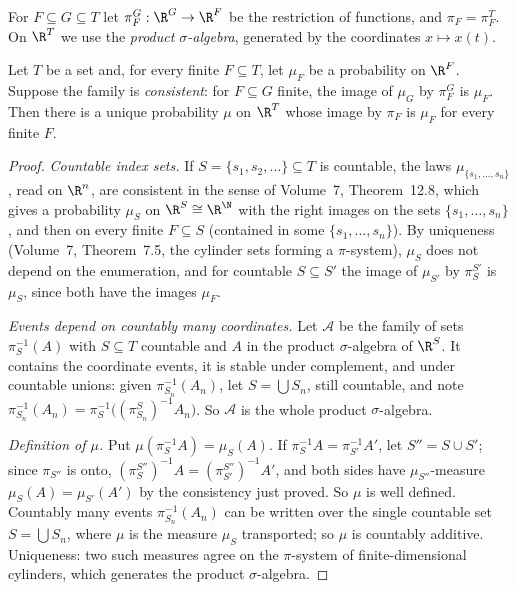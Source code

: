 For $F\subseteq G\subseteq T$ let $\pi^G_F:\R^G\to\R^F$ be the restriction of functions, and $\pi_F=\pi^T_F$. On $\R^T$ we use the \emph{product $\sigma$-algebra}, generated by the coordinates
$x\mapsto x(t)$.

\begin{theorem}\label{thm:kolmext}
Let $T$ be a set and, for every finite $F\subseteq T$, let $\mu_F$ be a probability on $\R^F$. Suppose the family is \emph{consistent}: for $F\subseteq G$ finite, the image of $\mu_G$ by $\pi^G_F$ is $\mu_F$.
Then there is a unique probability $\mu$ on $\R^T$ whose image by $\pi_F$ is $\mu_F$ for every finite $F$.
\end{theorem}

\begin{proof}
\emph{Countable index sets.} If $S=\{s_1,s_2,\dots\}\subseteq T$ is countable, the laws $\mu_{\{s_1,\dots,s_n\}}$, read on $\R^n$, are consistent in the sense of Volume~7, Theorem~12.8, which gives a probability $\mu_S$ on
$\R^S\cong\R^\N$ with the right images on the sets $\{s_1,\dots,s_n\}$, and then on every finite $F\subseteq S$ (contained in some $\{s_1,\dots,s_n\}$). By uniqueness (Volume~7, Theorem~7.5, the cylinder sets
forming a $\pi$-system), $\mu_S$ does not depend on the enumeration, and for countable $S\subseteq S'$ the image of $\mu_{S'}$ by $\pi^{S'}_S$ is $\mu_S$, since both have the images $\mu_F$.

\emph{Events depend on countably many coordinates.} Let $\mathcal A$ be the family of sets $\pi_S^{-1}(A)$ with $S\subseteq T$ countable and $A$ in the product $\sigma$-algebra of $\R^S$. It contains the
coordinate events, it is stable under complement, and under countable unions: given $\pi_{S_n}^{-1}(A_n)$, let $S=\bigcup S_n$, still countable, and note $\pi_{S_n}^{-1}(A_n)=\pi_S^{-1}\bigl((\pi^S_{S_n})^{-1}A_n\bigr)$.
So $\mathcal A$ is the whole product $\sigma$-algebra.

\emph{Definition of $\mu$.} Put $\mu(\pi_S^{-1}A)=\mu_S(A)$. If $\pi_S^{-1}A=\pi_{S'}^{-1}A'$, let $S''=S\cup S'$; since $\pi_{S''}$ is onto, $(\pi^{S''}_S)^{-1}A=(\pi^{S''}_{S'})^{-1}A'$, and both sides have
$\mu_{S''}$-measure $\mu_S(A)=\mu_{S'}(A')$ by the consistency just proved. So $\mu$ is well defined. Countably many events $\pi_{S_n}^{-1}(A_n)$ can be written over the single countable set
$S=\bigcup S_n$, where $\mu$ is the measure $\mu_S$ transported; so $\mu$ is countably additive. Uniqueness: two such measures agree on the $\pi$-system of finite-dimensional cylinders, which
generates the product $\sigma$-algebra.
\end{proof}

